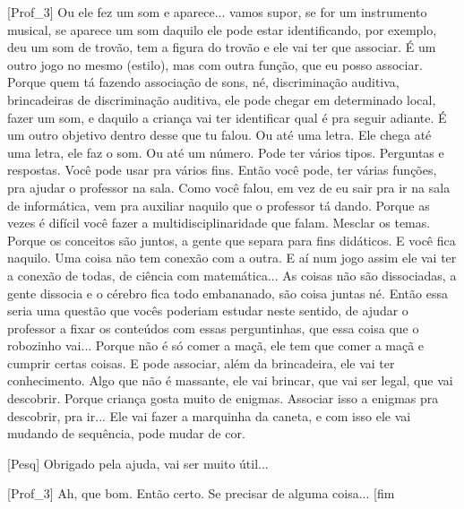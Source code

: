 [Prof\_3] Ou ele fez um som e aparece... vamos supor, se for um instrumento musical, se aparece um som daquilo ele pode estar identificando, por exemplo, deu um som de trovão, tem a figura do trovão e ele vai ter que associar. É um outro jogo no mesmo (estilo), mas com outra função, que eu posso associar. Porque quem tá fazendo associação de sons, né, discriminação auditiva, brincadeiras de discriminação auditiva, ele pode chegar em determinado local, fazer um som, e daquilo a criança vai ter identificar qual é pra seguir adiante. É um outro objetivo dentro desse que tu falou. Ou até uma letra. Ele chega até uma letra, ele faz o som. Ou até um número. Pode ter vários tipos. Perguntas e respostas. Você pode usar pra vários fins. Então você pode, ter várias funções, pra ajudar o professor na sala. Como você falou, em vez de eu sair pra ir na sala de informática, vem pra auxiliar naquilo que o professor tá dando. Porque as vezes é difícil você fazer a multidisciplinaridade que falam. Mesclar os temas. Porque os conceitos são juntos, a gente que separa para fins didáticos. E você fica naquilo. Uma coisa não tem conexão com a outra. E aí num jogo assim ele vai ter a conexão de todas, de ciência com matemática... As coisas não são dissociadas, a gente dissocia e o cérebro fica todo embananado, são coisa juntas né. Então essa seria uma questão que vocês poderiam estudar neste sentido, de ajudar o professor a fixar os conteúdos com essas perguntinhas, que essa coisa que o robozinho vai... Porque não é só comer a maçã, ele tem que comer a maçã e cumprir certas coisas. E pode associar, além da brincadeira, ele vai ter conhecimento. Algo que não é massante, ele vai brincar, que vai ser legal, que vai descobrir. Porque criança gosta muito de enigmas. Associar isso a enigmas pra descobrir, pra ir... Ele vai fazer a marquinha da caneta, e com isso ele vai mudando de sequência, pode mudar de cor. 

[Pesq] Obrigado pela ajuda, vai ser muito útil...

[Prof\_3] Ah, que bom. Então certo. Se precisar de alguma coisa...
[fim